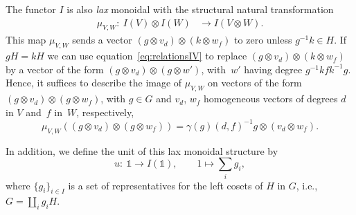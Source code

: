 \documentclass[pdftex]{sigma}
\numberwithin{equation}{section}
\newcommand{\one}{\mathds{1}}
\newcommand{\rI}{I}
\begin{document}
The functor $\rI$ is also \emph{lax} monoidal with the structural natural transformation
\begin{align*}
 \mu_{V,W}\colon\ \rI(V)\otimes \rI(W)&\to \rI(V\otimes W).
\end{align*}
This map $\mu_{V,W}$ sends a vector $(g\otimes v_d)\otimes (k\otimes w_f)$ to zero unless $g^{-1}k\in H$. If $gH=kH$ we can use equation~\eqref{eq:relationsIV} to replace
$(g\otimes v_d)\otimes (k\otimes w_f)$ by a vector of the form $(g\otimes v_d)\otimes (g\otimes w')$, with~$w'$ having degree $g^{-1}kfk^{-1}g$. Hence,
it suffices to describe the image of $\mu_{V,W}$ on vectors of the form $(g\otimes v_d)\otimes (g\otimes w_f)$, with $g\in G$ and $v_d$, $w_f$ homogeneous vectors of degrees $d$ in $V$ and~$f$ in~$W$, respectively,
\[
 \mu_{V,W}((g\otimes v_d)\otimes (g\otimes w_f))=\gamma(g)(d,f)^{-1}g\otimes (v_d\otimes w_f).
\]

In addition, we define the unit of this lax monoidal structure by
\begin{equation}\label{eq:lax-unit}
u\colon\ \one \to I(\one), \qquad 1\mapsto \sum_{i}g_i,
\end{equation}
where $\{g_i\}_{i\in I}$ is a set of representatives for the left cosets of $H$ in $G$, i.e., $G=\coprod\limits_i g_iH$.
\end{document}
